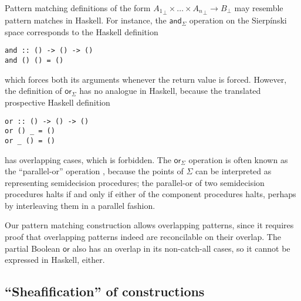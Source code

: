 \documentclass[conference]{IEEEtran}
\begin{document}
Pattern matching definitions of the form ${A_1}_\bot \times \ldots \times {A_n}_\bot \to B_\bot$ may resemble pattern matches in Haskell. For instance, the $\mathsf{and}_\Sigma$ operation on the Sierp\'inski space corresponds to the Haskell definition
\begin{Verbatim}[samepage=true]
and :: () -> () -> ()
and () () = ()
\end{Verbatim}
which forces both its arguments whenever the return value is forced. However, the definition of $\mathsf{or}_\Sigma$ has no analogue in Haskell, because the translated prospective Haskell definition
\begin{Verbatim}[samepage=true]
or :: () -> () -> ()
or () _ = ()
or _ () = ()
\end{Verbatim}
has overlapping cases, which is forbidden.
The $\mathsf{or}_\Sigma$ operation is often known as the ``parallel-or'' operation \cite{escardo2004}, because the points of $\Sigma$ can be interpreted as representing semidecision procedures; the parallel-or of two semidecision procedures halts if and only if either of the component procedures halts, perhaps by interleaving them in a parallel fashion.

Our pattern matching construction allows overlapping patterns, since it requires proof that overlapping patterns indeed are reconcilable on their overlap. The partial Boolean $\mathsf{or}$ also has an overlap in its non-catch-all cases, so it cannot be expressed in Haskell, either.

\subsection{``Sheafification'' of constructions}
\label{s:ex:sheaf}
\end{document}
